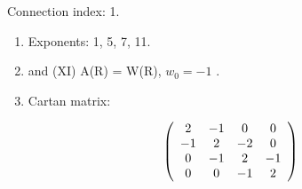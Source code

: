 Connection index: 1.

\begin{enumerate}
\def\labelenumi{(\Roman{enumi})}
\setcounter{enumi}{8}
\item
  Exponents: 1, 5, 7, 11.
\item
  and (XI) A(R) = W(R), \(w_{0} = -1\) .
\item
  Cartan matrix:
\end{enumerate}

\[
\left( \begin{array}{c c c c} 2 & - 1 & 0 & 0 \\ - 1 & 2 & - 2 & 0 \\ 0 & - 1 & 2 & - 1 \\ 0 & 0 & - 1 & 2 \end{array} \right)
\]

